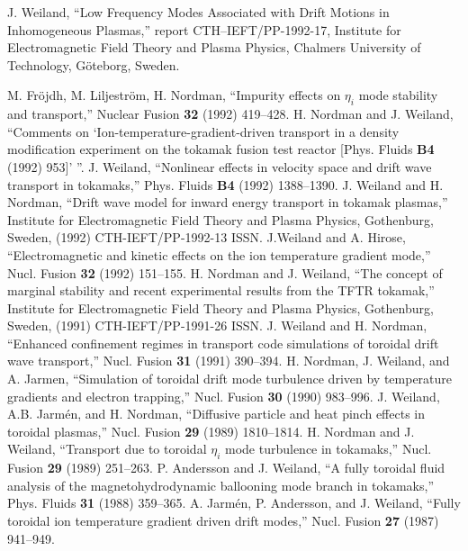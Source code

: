 \begin{thebibliography}{99}

 J. Weiland,
``Low Frequency Modes Associated with Drift Motions in
Inhomogeneous Plasmas,''
report CTH--IEFT/PP-1992-17,
Institute for Electromagnetic Field Theory and Plasma Physics,
Chalmers University of Technology,
G\"{o}teborg, Sweden.

 M. Fr\"{o}jdh, M. Liljestr\"{o}m, H. Nordman,
``Impurity effects on $\eta_i$ mode stability and transport,''
Nuclear Fusion {\bf 32} (1992) 419--428.
 H. Nordman and J. Weiland, ``Comments on
`Ion-temperature-gradient-driven 
transport in a density modification experiment on the tokamak fusion test
reactor [Phys. Fluids {\bf B4} (1992) 953]' ''.
 J. Weiland, 
``Nonlinear effects in velocity space and drift wave
transport in tokamaks,'' Phys. Fluids {\bf B4} (1992) 1388--1390.
 J. Weiland and H. Nordman, ``Drift wave model for inward
energy transport in tokamak plasmas,'' Institute for Electromagnetic Field
Theory and Plasma Physics, Gothenburg, Sweden, (1992) CTH-IEFT/PP-1992-13 ISSN.
 J.Weiland and A. Hirose, ``Electromagnetic and kinetic
effects on the ion temperature gradient mode,'' Nucl. Fusion {\bf 32} (1992)
151--155.
 H. Nordman and J. Weiland, ``The concept of marginal
stability and recent experimental results from the TFTR tokamak,'' Institute
for Electromagnetic Field Theory and Plasma Physics, Gothenburg, Sweden, (1991)
CTH-IEFT/PP-1991-26 ISSN.
 J. Weiland and H. Nordman, ``Enhanced confinement regimes in
transport code simulations of toroidal drift wave transport,'' Nucl. Fusion
{\bf 31} (1991) 390--394.
 H. Nordman, J. Weiland, and A. Jarmen, ``Simulation of
toroidal drift mode turbulence driven by temperature gradients and electron
trapping,'' Nucl. Fusion {\bf 30} (1990) 983--996.
 J. Weiland, A.B. Jarm\'{e}n, and H. Nordman, ``Diffusive
particle and heat pinch effects in toroidal plasmas,'' Nucl. Fusion {\bf 29}
(1989) 1810--1814.
 H. Nordman and J. Weiland, ``Transport due to toroidal
$\eta_i$ mode turbulence in tokamaks,'' Nucl. Fusion {\bf 29} (1989) 251--263.
 P. Andersson and J. Weiland, ``A fully toroidal fluid analysis
of the magnetohydrodynamic ballooning mode branch in tokamaks,'' Phys. Fluids
{\bf 31} (1988) 359--365.
 A. Jarm\'{e}n, P. Andersson, and J. Weiland, ``Fully toroidal
ion temperature gradient driven drift modes,'' Nucl. Fusion {\bf 27} (1987)
941--949.
\end{thebibliography}

